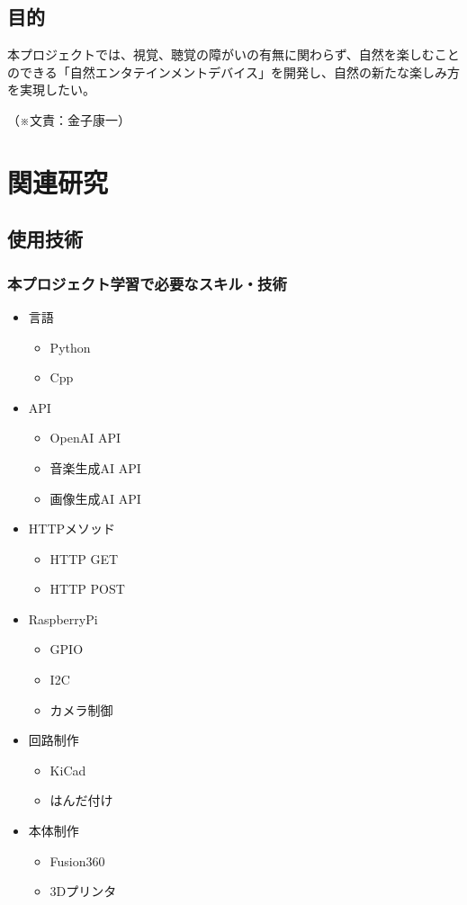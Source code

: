 \documentclass[12pt,a4paper]{report}
\newcommand{\Writer}[1]{
  \normalsize
  \begin{flushright}
    （※文責：#1）
  \end{flushright}
}
\begin{document}
\section{目的}
\noindent\space
本プロジェクトでは、視覚、聴覚の障がいの有無に関わらず、自然を楽しむことのできる「自然エンタテインメントデバイス」を開発し、自然の新たな楽しみ方を実現したい。
\Writer{金子康一}

\chapter{関連研究}
\section{使用技術}
\subsection{本プロジェクト学習で必要なスキル・技術}
\noindent\space
\begin{itemize}
  \item 言語
  \begin{itemize}
    \item Python
    \item Cpp
  \end{itemize}
  \item API
  \begin{itemize}
    \item OpenAI API
    \item 音楽生成AI API
    \item 画像生成AI API
  \end{itemize}
  \item HTTPメソッド
  \begin{itemize}
    \item HTTP GET
    \item HTTP POST
  \end{itemize}
  \item RaspberryPi
  \begin{itemize}
    \item GPIO
    \item I2C
    \item カメラ制御
  \end{itemize}
  \item 回路制作
  \begin{itemize}
    \item KiCad
    \item はんだ付け
  \end{itemize}
  \item 本体制作
  \begin{itemize}
    \item Fusion360
    \item 3Dプリンタ
  \end{itemize}
\end{itemize}
\end{document}
